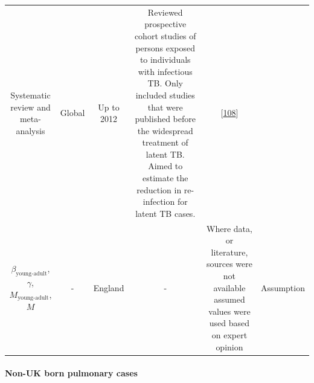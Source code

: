 \documentclass[11pt,twoside]{bristolthesis}
\begin{document}
\begin{longtable}[]{@{}cccccc@{}}
\begin{minipage}[t]{0.10\columnwidth}
  Systematic
  review and
  meta-analysis\strut
  \end{minipage} & \begin{minipage}[t]{0.07\columnwidth}\centering
  Global\strut
  \end{minipage} & \begin{minipage}[t]{0.07\columnwidth}\centering
  Up to
  2012\strut
  \end{minipage} & \begin{minipage}[t]{0.27\columnwidth}\centering
  Reviewed prospective cohort studies of
  persons exposed to individuals with
  infectious TB. Only included studies
  that were published before the
  widespread treatment of latent TB. Aimed
  to estimate the reduction in
  re-infection for latent TB cases.\strut
  \end{minipage} & \begin{minipage}[t]{0.11\columnwidth}\centering
  {[}\protect\hyperlink{ref-Andrews2012}{108}{]}\strut
  \end{minipage}\tabularnewline
  \begin{minipage}[t]{0.21\columnwidth}\centering
  \(\beta_{\text{young-adult}}\),
  \(\gamma\),
  \(M_{\text{young-adult}}\),
  \(M\)\strut
  \end{minipage} & \begin{minipage}[t]{0.10\columnwidth}\centering
  -\strut
  \end{minipage} & \begin{minipage}[t]{0.07\columnwidth}\centering
  England\strut
  \end{minipage} & \begin{minipage}[t]{0.07\columnwidth}\centering
  -\strut
  \end{minipage} & \begin{minipage}[t]{0.27\columnwidth}\centering
  Where data, or literature, sources were
  not available assumed values were used
  based on expert opinion\strut
  \end{minipage} & \begin{minipage}[t]{0.11\columnwidth}\centering
  Assumption\strut
  \end{minipage}\tabularnewline
  \bottomrule
  \end{longtable}
  \hypertarget{non-uk-born-pulmonary-cases}{%
  \paragraph{Non-UK born pulmonary cases}\label{non-uk-born-pulmonary-cases}}
  
\end{document}
